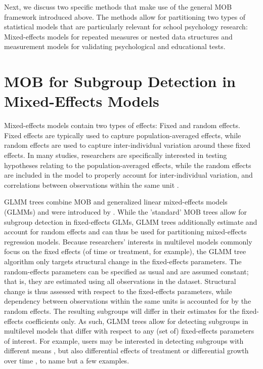 \documentclass[doc,floatsintext,natbib]{apa7}
\begin{document}
Next, we discuss two specific methods that make use of the general MOB framework introduced above. The methods allow for partitioning two types of statistical models that are particularly relevant for school psychology research: Mixed-effects models for repeated measures or nested data structures and measurement models for validating psychological and educational tests. 


\section{MOB for Subgroup Detection in Mixed-Effects Models}
\label{glmmtree}

Mixed-effects models contain two types of effects: Fixed and random effects. Fixed effects are typically used to capture population-averaged effects, while random effects are used to capture inter-individual variation around these fixed effects. In many studies, researchers are specifically interested in testing hypotheses relating to the population-averaged effects, while the random effects are included in the model to properly account for inter-individual variation, and correlations between observations within the same unit \citep{RaudyBush02}.

GLMM trees combine MOB and generalized linear mixed-effects models (GLMMs) and were introduced by \cite{FokkySmit18}. While the 'standard' MOB trees \citep{ZeilyHoth08} allow for subgroup detection in fixed-effects GLMs, GLMM trees additionally estimate and account for random effects and can thus be used for partitioning mixed-effects regression models. Because researchers' interests in multilevel models commonly focus on the fixed effects (of time or treatment, for example), the GLMM tree algorithm only targets structural change in the fixed-effects parameters. The random-effects parameters can be specified as usual and are assumed constant; that is, they are estimated using all observations in the dataset. Structural change is thus assessed with respect to the fixed-effects parameters, while dependency between observations within the same units is accounted for by the random effects. The resulting subgroups will differ in their estimates for the fixed-effects coefficients only. As such, GLMM trees allow for detecting subgroups in multilevel models that differ with respect to any (set of) fixed-effects parameters of interest. For example, users may be interested in detecting subgroups with different means \citep{FokkyEdbr21}, but also differential effects of treatment \citep{FokkySmit18} or differential growth over time \citep{FokkyZeil24}, to name but a few examples. 
\end{document}

